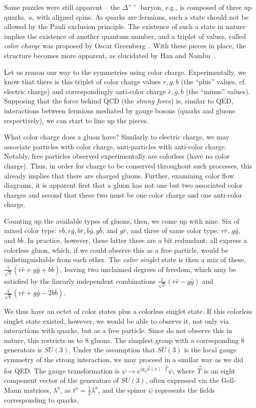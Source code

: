 Some puzzles were still apparent -- the $\Delta^{++}$ baryon, e.g., is composed of three up quarks, 
$u$, with aligned spins. As quarks are fermions, such a state should not be allowed by the Pauli exclusion 
principle. The existence of such a state in nature implies the existence of another quantum number, and 
a triplet of values, called \emph{color charge} was proposed by Oscar Greenberg~\cite{Greenberg}. With these
pieces in place, the structure becomes more apparent, as elucidated by Han and Nambu~\cite{Han-Nambu}.

Let us reason our way to the symmetries using color charge. Experimentally, we know that there is this triplet
of color charge values $r, g, b$ (the ``plus'' values, cf. electric charge) and correspondingly anti-color charge
$\bar{r}, \bar{g}, \bar{b}$ (the ``minus'' values). Supposing that the force behind QCD (the \emph{strong force}) is, 
similar to QED, interactions between fermions mediated by gauge bosons (quarks and gluons respectively), we can 
start to line up the pieces.

What color charge does a gluon have? Similarly to electric charge, we may associate particles
with color charge, anti-particles with anti-color charge. Notably, free particles observed experimentally are 
colorless (have no color charge). Thus, in order for charge to be conserved throughout such 
processes, this already implies that there are charged gluons. Further, examining color flow diagrams, 
it is apparent first that a gluon has not one but two associated color charges
and second that these two must be one color charge and one anti-color charge.

Counting up the available types of gluons, then, we come up with nine. Six of mixed color type: 
$r\bar{b}, r\bar{g}, b\bar{r}, b\bar{g}, g\bar{b}$, and $g\bar{r}$, and three of same color type:
$r\bar{r}$, $g\bar{g}$, and $b\bar{b}$. In practice, however, these latter three are a bit redundant:
all express a colorless gluon, which, if we could observe this as a free particle, would be indistinguishable
from each other. The \emph{color singlet} state is then a mix of these, $\frac{1}{\sqrt{3}}(r\bar{r}+g\bar{g}+b\bar{b})$,
leaving two unclaimed degrees of freedom, which may be satisfied by the linearly independent combinations
$\frac{1}{\sqrt{2}}(r\bar{r}-g\bar{g})$ and $\frac{1}{\sqrt{6}}(r\bar{r}+g\bar{g}-2b\bar{b})$.

We thus have an octet of color states plus a colorless singlet state. If this colorless singlet state 
existed, however, we would be able to observe it, not only via interactions with quarks, but as a free
particle. Since do not observe this in nature, this restricts us to $8$ gluons. The simplest group with 
a corresponding 8 generators is $SU(3)$. Under the assumption that $SU(3)$ is the local gauge symmetry
of the strong interaction, we may proceed in a similar way as we did for QED. The gauge transformation is 
$\psi \rightarrow e^{ig_{S}\vec{\alpha}(x)\cdot \vec{T}}\psi$, where $\vec{T}$ is an eight component vector
of the generators of $SU(3)$, often expressed via the Gell-Mann matrices, $\lambda^{a}$, as $t^{a} = \frac{1}{2}\lambda^{a}$,
and the spinor $\psi$ represents the fields corresponding to quarks.

